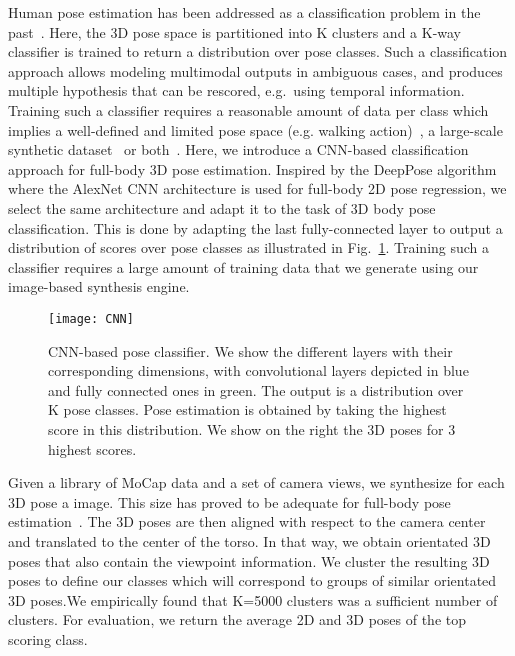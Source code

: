 \documentclass{article}
\begin{document}
Human pose estimation has been addressed as a classification problem in the past~\cite{BissaccoYS06,OkadaS08, RogezSR15, RogezROT12}. Here, the 3D pose space is partitioned into K clusters and a K-way classifier is trained to return a distribution over pose classes. Such a classification approach allows modeling multimodal outputs in ambiguous cases, and produces multiple hypothesis that can be rescored, e.g.\ using temporal information. Training such a classifier requires a reasonable amount of data per class which implies a well-defined and limited pose space (e.g. walking action)~\cite{RogezROT12,BissaccoYS06}, a large-scale synthetic dataset~\cite{RogezSR15} or both~\cite{OkadaS08}.  
Here, we introduce a CNN-based classification approach for full-body 3D pose estimation. Inspired by the DeepPose algorithm~\cite{ToshevS14_DeepPose} where the AlexNet CNN architecture \cite{NIPS2012_Alexnet} is used for full-body 2D pose regression, we select the same architecture and adapt it to the task of 3D body pose classification. This is done by adapting the last fully-connected layer to output a distribution of scores over pose classes as illustrated in Fig.~\ref{fig:CNN}. 
 Training such a classifier requires a large amount of training data that we generate using our image-based synthesis engine. 
  \begin{figure}[t]
   \centering 
  \hspace{-0mm}\texttt{[image: CNN]}
   \vspace{-3mm}\caption{\footnotesize  CNN-based pose classifier. We show the different layers with their corresponding dimensions, with convolutional layers depicted in blue and fully connected ones in green.  
The output is a distribution over K pose classes. Pose estimation is obtained by taking the highest score in this distribution. We show on the right the 3D poses for 3 highest scores.}
     \label{fig:CNN}
 \end{figure} 

 
Given a library of MoCap data and a set of camera views, we synthesize for each 3D pose a  image. This size has proved to be adequate for full-body pose estimation~\cite{ToshevS14_DeepPose}. The 3D poses are then aligned with respect to the camera center and translated to the center of the torso. In that way, we obtain orientated 3D poses that also contain the viewpoint information. We cluster the resulting 3D poses to define our classes which will correspond to groups of similar orientated 3D poses.We empirically found that K=5000 clusters was a sufficient number of clusters. For evaluation, we return the average 2D and 3D poses of the top scoring class. 
\end{document}
